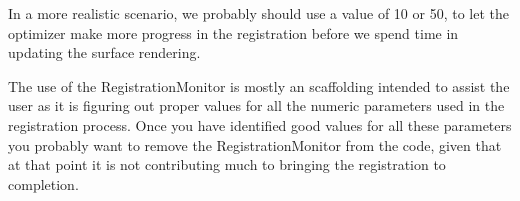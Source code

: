 \documentclass{InsightArticle}
\begin{document}
In a more realistic scenario, we probably should use a value of 10 or 50, to
let the optimizer make more progress in the registration before we spend time
in updating the surface rendering.

The use of the RegistrationMonitor is mostly an scaffolding intended to assist
the user as it is figuring out proper values for all the numeric parameters
used in the registration process. Once you have identified good values for all
these parameters you probably want to remove the RegistrationMonitor from the
code, given that at that point it is not contributing much to bringing the
registration to completion.


%
%



\end{document}
